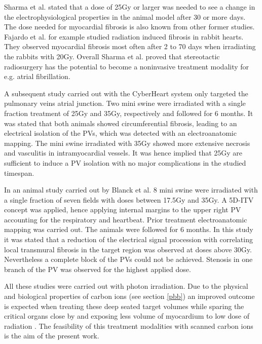 Sharma et al. stated that a dose of 25Gy or larger was needed to see a change in the electrophysiological properties in the animal model 
after 30 or more days. The dose needed for myocardial fibrosis is also known from other former studies. Fajardo et al. \cite{Faj70, Faj73} for 
example studied radiation induced fibrosis in rabbit hearts. They observed myocardial fibrosis most often after 2 to 70 days when irradiating 
the rabbits with 20Gy. Overall Sharma et al. proved that stereotactic radiosurgery has the potential to become a noninvasive treatment 
modality for e.g. atrial fibrillation. \newline

A subsequent study carried out with the CyberHeart system \cite{Mag11} only targeted the pulmonary veins atrial junction. Two mini swine 
were irradiated with a single fraction treatment of 25Gy and 35Gy, respectively and followed for 6 months. It was stated that both animals 
showed circumferential fibrosis, leading to an electrical isolation of the PVs, which was detected with an electroanatomic mapping. 
The mini swine irradiated with 35Gy showed more extensive necrosis and vasculitis in intramyocardial vessels. It was hence implied that 
25Gy are sufficient to induce a PV isolation with no major complications in the studied timespan. \newline

In an animal study carried out by Blanck et al. \cite{Bla13} 8 mini swine were irradiated with a single fraction of seven fields with doses 
between 17.5Gy and 35Gy. A 5D-ITV concept was applied, hence applying internal margins to the upper right PV accounting for the respiratory 
and heartbeat. Prior treatment electroanatomic mapping was carried out. The animals were followed for 6 months. In this study it was stated 
that a reduction of the electrical signal procession with correlating local transmural fibrosis in the target region was observed at 
doses above 30Gy. Nevertheless a complete block of the PVs could not be achieved. Stenosis in one branch of 
the PV was observed for the highest applied dose.\newline

All these studies were carried out with photon irradiation. Due to the physical and biological properties of carbon ions (see section \ref{pbb}) 
an improved outcome is expected when treating these deep seated target volumes while sparing the critical organs close by and exposing 
less volume of myocardium to low dose of radiation \cite{Ber12}. The feasibility of this treatment modalities with scanned carbon ions is the aim of 
the present work. 


                                                                                                                                                                                                                              
% 
